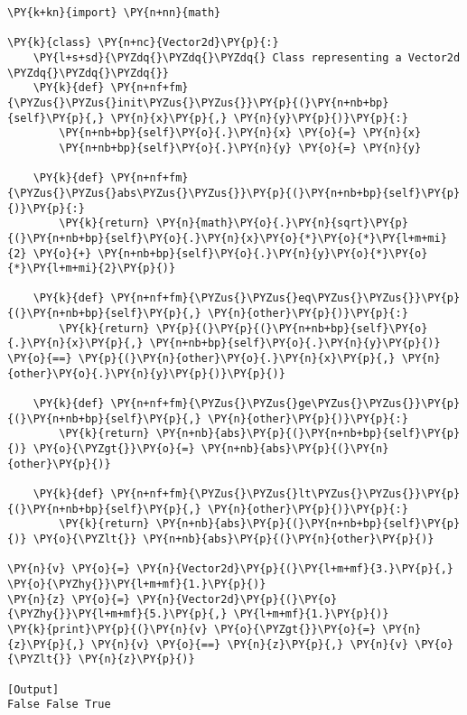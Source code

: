 \begin{Verbatim}[label=\makebox{\url{https://bitbucket.org/lbaldini/programming/src/tip/snippets/vector2d\_6.py}},commandchars=\\\{\}]
\PY{k+kn}{import} \PY{n+nn}{math}

\PY{k}{class} \PY{n+nc}{Vector2d}\PY{p}{:}
    \PY{l+s+sd}{\PYZdq{}\PYZdq{}\PYZdq{} Class representing a Vector2d \PYZdq{}\PYZdq{}\PYZdq{}}   
    \PY{k}{def} \PY{n+nf+fm}{\PYZus{}\PYZus{}init\PYZus{}\PYZus{}}\PY{p}{(}\PY{n+nb+bp}{self}\PY{p}{,} \PY{n}{x}\PY{p}{,} \PY{n}{y}\PY{p}{)}\PY{p}{:}
        \PY{n+nb+bp}{self}\PY{o}{.}\PY{n}{x} \PY{o}{=} \PY{n}{x}
        \PY{n+nb+bp}{self}\PY{o}{.}\PY{n}{y} \PY{o}{=} \PY{n}{y}
    
    \PY{k}{def} \PY{n+nf+fm}{\PYZus{}\PYZus{}abs\PYZus{}\PYZus{}}\PY{p}{(}\PY{n+nb+bp}{self}\PY{p}{)}\PY{p}{:}
        \PY{k}{return} \PY{n}{math}\PY{o}{.}\PY{n}{sqrt}\PY{p}{(}\PY{n+nb+bp}{self}\PY{o}{.}\PY{n}{x}\PY{o}{*}\PY{o}{*}\PY{l+m+mi}{2} \PY{o}{+} \PY{n+nb+bp}{self}\PY{o}{.}\PY{n}{y}\PY{o}{*}\PY{o}{*}\PY{l+m+mi}{2}\PY{p}{)}
    
    \PY{k}{def} \PY{n+nf+fm}{\PYZus{}\PYZus{}eq\PYZus{}\PYZus{}}\PY{p}{(}\PY{n+nb+bp}{self}\PY{p}{,} \PY{n}{other}\PY{p}{)}\PY{p}{:}
        \PY{k}{return} \PY{p}{(}\PY{p}{(}\PY{n+nb+bp}{self}\PY{o}{.}\PY{n}{x}\PY{p}{,} \PY{n+nb+bp}{self}\PY{o}{.}\PY{n}{y}\PY{p}{)} \PY{o}{==} \PY{p}{(}\PY{n}{other}\PY{o}{.}\PY{n}{x}\PY{p}{,} \PY{n}{other}\PY{o}{.}\PY{n}{y}\PY{p}{)}\PY{p}{)} 
        
    \PY{k}{def} \PY{n+nf+fm}{\PYZus{}\PYZus{}ge\PYZus{}\PYZus{}}\PY{p}{(}\PY{n+nb+bp}{self}\PY{p}{,} \PY{n}{other}\PY{p}{)}\PY{p}{:}
        \PY{k}{return} \PY{n+nb}{abs}\PY{p}{(}\PY{n+nb+bp}{self}\PY{p}{)} \PY{o}{\PYZgt{}}\PY{o}{=} \PY{n+nb}{abs}\PY{p}{(}\PY{n}{other}\PY{p}{)}
        
    \PY{k}{def} \PY{n+nf+fm}{\PYZus{}\PYZus{}lt\PYZus{}\PYZus{}}\PY{p}{(}\PY{n+nb+bp}{self}\PY{p}{,} \PY{n}{other}\PY{p}{)}\PY{p}{:}
        \PY{k}{return} \PY{n+nb}{abs}\PY{p}{(}\PY{n+nb+bp}{self}\PY{p}{)} \PY{o}{\PYZlt{}} \PY{n+nb}{abs}\PY{p}{(}\PY{n}{other}\PY{p}{)}

\PY{n}{v} \PY{o}{=} \PY{n}{Vector2d}\PY{p}{(}\PY{l+m+mf}{3.}\PY{p}{,} \PY{o}{\PYZhy{}}\PY{l+m+mf}{1.}\PY{p}{)}
\PY{n}{z} \PY{o}{=} \PY{n}{Vector2d}\PY{p}{(}\PY{o}{\PYZhy{}}\PY{l+m+mf}{5.}\PY{p}{,} \PY{l+m+mf}{1.}\PY{p}{)}
\PY{k}{print}\PY{p}{(}\PY{n}{v} \PY{o}{\PYZgt{}}\PY{o}{=} \PY{n}{z}\PY{p}{,} \PY{n}{v} \PY{o}{==} \PY{n}{z}\PY{p}{,} \PY{n}{v} \PY{o}{\PYZlt{}} \PY{n}{z}\PY{p}{)}

[Output]
False False True
\end{Verbatim}